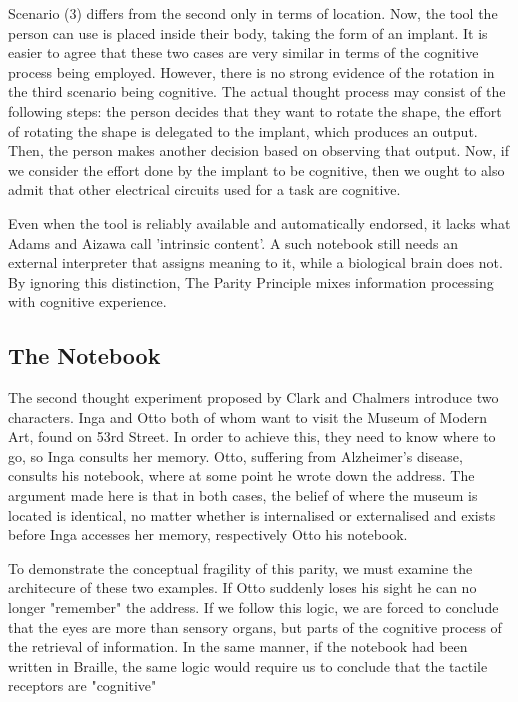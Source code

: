 \documentclass[12pt]{article}
\begin{document}
Scenario (3) differs from the second only in terms of location. Now, the tool the person
can use is placed inside their body, taking the form of an implant. It is easier to agree
that these two cases are very similar in terms of the cognitive process being employed.
However, there is no strong evidence of the rotation in the third scenario being 
cognitive. The actual thought process may consist of the following steps: the person decides
that they want to rotate the shape, the effort of rotating the shape is delegated
to the implant, which produces an output. Then, the person makes another decision based on 
observing that output. Now, if we consider the effort done by the implant to be cognitive, then we ought to 
also admit that other electrical circuits used for a task are cognitive. 

Even when the tool is reliably available and automatically endorsed, it lacks what Adams 
and Aizawa call 'intrinsic content'. A such notebook still needs an external interpreter that
assigns meaning to it, while a biological brain does not. By ignoring this distinction, 
The Parity Principle mixes information processing with cognitive experience.

\subsection{The Notebook}

The second thought experiment proposed by Clark and Chalmers introduce two characters. Inga and Otto
both of whom want to visit the Museum of Modern Art, found on 53rd Street. In order to achieve this, 
they need to know where to go, so Inga consults her memory. Otto, suffering from Alzheimer's
disease, consults his notebook, where at some point he wrote down the address. The
argument made here is that in both cases, the belief of where the museum is located is
identical, no matter whether is internalised or externalised and exists before Inga accesses
her memory, respectively Otto his notebook.

To demonstrate the conceptual fragility of this parity, we must examine the architecure of 
these two examples. If Otto suddenly loses his sight he can no longer "remember" 
the address. If we follow this logic, we are forced to conclude that the eyes are more than 
sensory organs, but parts of the cognitive process of the retrieval of information.
In the same manner, if the notebook had been written in Braille, the same logic would require 
us to conclude that the tactile receptors are "cognitive"
\end{document}
